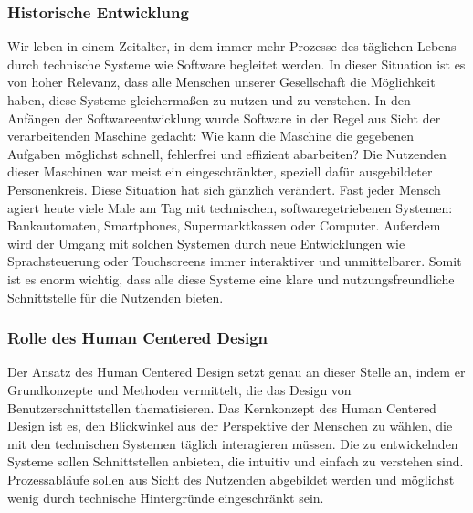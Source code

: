 \subsubsection{Historische Entwicklung}
Wir leben in einem Zeitalter, in dem immer mehr Prozesse des täglichen Lebens
durch technische Systeme wie Software begleitet werden. In dieser Situation ist
es von hoher Relevanz, dass alle Menschen unserer Gesellschaft die Möglichkeit
haben, diese Systeme gleichermaßen zu nutzen und zu verstehen. In den Anfängen
der Softwareentwicklung wurde Software in der Regel aus Sicht der
verarbeitenden Maschine gedacht: Wie kann die Maschine die gegebenen Aufgaben
möglichst schnell, fehlerfrei und effizient abarbeiten? Die Nutzenden dieser
Maschinen war meist ein eingeschränkter, speziell dafür ausgebildeter
Personenkreis. Diese Situation hat sich gänzlich verändert. Fast jeder Mensch
agiert heute viele Male am Tag mit technischen, softwaregetriebenen Systemen:
Bankautomaten, Smartphones, Supermarktkassen oder Computer. Außerdem wird der
Umgang mit solchen Systemen durch neue Entwicklungen wie Sprachsteuerung oder
Touchscreens immer interaktiver und unmittelbarer. Somit ist es enorm wichtig,
dass alle diese Systeme eine klare und nutzungsfreundliche Schnittstelle für
die Nutzenden bieten\cite{moserTesting}.

\subsubsection{Rolle des Human Centered Design}
Der Ansatz des Human Centered Design setzt genau an dieser Stelle an, indem er
Grundkonzepte und Methoden vermittelt, die das Design von
Benutzerschnittstellen thematisieren\cite{hcd}. Das Kernkonzept des Human
Centered Design ist es, den Blickwinkel aus der Perspektive der Menschen zu
wählen, die mit den technischen Systemen täglich interagieren müssen. Die zu
entwickelnden Systeme sollen Schnittstellen anbieten, die intuitiv und einfach
zu verstehen sind. Prozessabläufe sollen aus Sicht des Nutzenden abgebildet
werden und möglichst wenig durch technische Hintergründe eingeschränkt
sein\cite{HMI-HCD}.

